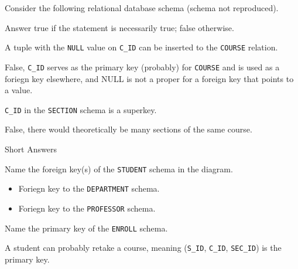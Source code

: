 \documentclass[11pt]{article}
\begin{document}
\begin{question}
    Consider the following relational database schema (schema not reproduced).

    \begin{subquestion}
        Answer true if the statement is necessarily true; false otherwise.

        \begin{subsubquestion}
            A tuple with the {\tt NULL} value on {\tt C\_ID} can be inserted to the {\tt COURSE} relation.

            False, {\tt C\_ID} serves as the primary key (probably) for {\tt COURSE} and is used as a foriegn key elsewhere, and NULL is not a proper for a foreign key that points to a value.

        \end{subsubquestion}

        \begin{subsubquestion}
            {\tt C\_ID} in the {\tt SECTION} schema is a superkey.

            False, there would theoretically be many sections of the same course.
        \end{subsubquestion}
    \end{subquestion}

    \begin{subquestion}
        Short Answers

        \begin{subsubquestion}
            Name the foreign key(s) of the {\tt STUDENT} schema in the diagram.

            \begin{itemize}
                \item[{\tt D\_ID}]{
                    Foriegn key to the {\tt DEPARTMENT} schema.
                }
                \item[{\tt P\_ID}]{
                    Foriegn key to the {\tt PROFESSOR} schema.
                }
            \end{itemize}
        \end{subsubquestion}
        \begin{subsubquestion}
            Name the primary key of the {\tt ENROLL} schema.\

            A student can probably retake a course, meaning ({\tt S\_ID}, {\tt C\_ID}, {\tt SEC\_ID}) is the primary key.
        \end{subsubquestion}
    \end{subquestion}
\end{question}
\end{document}
